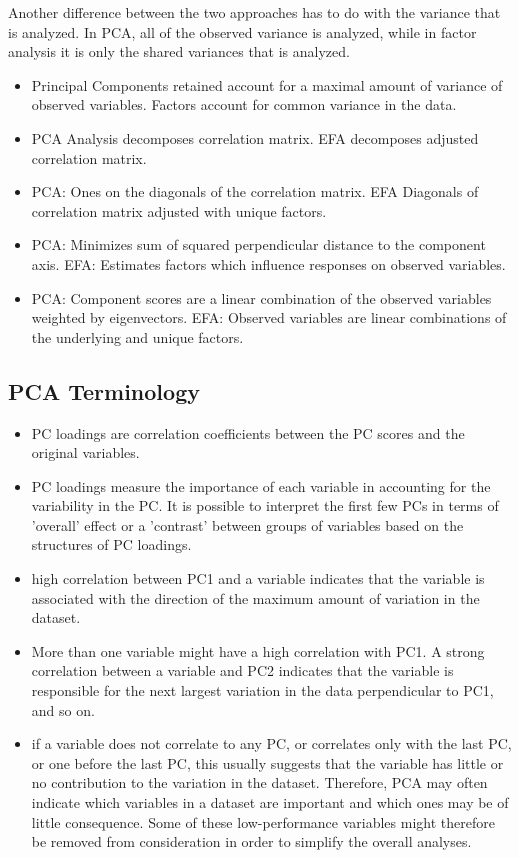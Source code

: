Another difference between the two approaches has to do with the variance that is analyzed. In PCA, all of the observed variance is analyzed, while in factor analysis it is only the shared variances that is analyzed.
\begin{itemize}
\item Principal Components retained account for a maximal amount of variance of observed variables.
Factors account for common variance in the data.

\item PCA Analysis decomposes correlation matrix. EFA  decomposes adjusted correlation matrix.

\item PCA: Ones on the diagonals of the correlation matrix. EFA Diagonals of correlation matrix adjusted with unique factors.

\item PCA: Minimizes sum of squared perpendicular distance to
the component axis. EFA: Estimates factors which influence responses on
observed variables.
\item PCA: Component scores are a linear combination of the
observed variables weighted by eigenvectors.
EFA: Observed variables are linear combinations of the
underlying and unique factors.
\end{itemize}


\newpage

\subsection{PCA Terminology}
\begin{itemize}
\item  PC loadings are correlation coefficients between the PC scores and the
original variables.
\item  PC loadings measure the importance of each variable in accounting for the
variability in the PC.  It is possible to interpret the first few PCs in terms of
'overall' effect or a 'contrast' between groups of variables based on the
structures of PC loadings.
\item high correlation between PC1 and a variable indicates that the variable is
associated with the direction of the maximum amount of variation in the
dataset.
\item More than one variable might have a high correlation with PC1. A strong
correlation between a variable and PC2 indicates that the variable is
responsible for the next largest variation in the data perpendicular to PC1,
and so on.
\item  if a variable does not correlate to any PC, or correlates only with the last PC,
or one before the last PC, this usually suggests that the variable has little or
no contribution to the variation in the dataset. Therefore, PCA may often
indicate which variables in a dataset are important and which ones may be of
little consequence. Some of these low-performance variables might
therefore be removed from consideration in order to simplify the overall
analyses.
\end{itemize}


